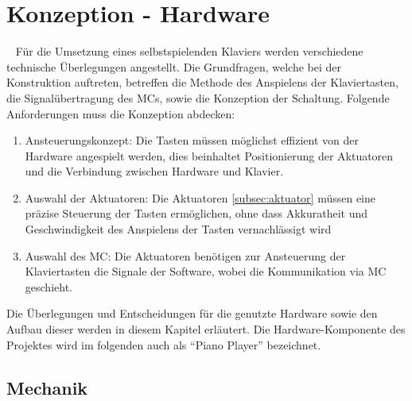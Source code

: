 
\graphicspath{ {./img/} }

\chapter{Konzeption - Hardware}\label{konzeptionHW}~\nocite{*}
Für die Umsetzung eines selbstspielenden Klaviers werden verschiedene technische Überlegungen angestellt.
Die Grundfragen, welche bei der Konstruktion auftreten, betreffen die Methode des Anspielens der Klaviertasten, die
Signalübertragung des \ac{MC}s, sowie die Konzeption der Schaltung.
Folgende Anforderungen muss die Konzeption abdecken:
\begin{enumerate}
	\item Ansteuerungskonzept: Die Tasten müssen möglichst effizient von der Hardware angespielt werden, dies beinhaltet Positionierung der Aktuatoren und die Verbindung zwischen Hardware und Klavier.
	\item Auswahl der Aktuatoren: Die Aktuatoren \ref{subsec:aktuator} müssen eine präzise Steuerung der Tasten ermöglichen, ohne dass Akkuratheit und Geschwindigkeit des Anspielens der Tasten vernachlässigt wird
	\item Auswahl des \ac{MC}: Die Aktuatoren benötigen zur Ansteuerung der Klaviertasten die Signale der Software, wobei die Kommunikation via \ac{MC} geschieht.
\end{enumerate}
Die Überlegungen und Entscheidungen für die genutzte Hardware sowie den Aufbau dieser werden in diesem Kapitel erläutert.
Die Hardware-Komponente des Projektes wird im folgenden auch als \enquote{Piano Player} bezeichnet.

\section{Mechanik}\label{konzeptionHW-mechanik}

